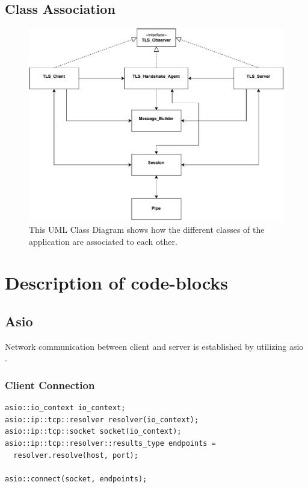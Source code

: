 \documentclass[12pt, letterpaper]{article}
\newenvironment{code}{\captionsetup{type=listing}}{}
\begin{document}
\subsection{Class Association}

\begin{figure}[H]
	\centering
	\includegraphics[width=.7\textwidth]{UML/ClassInteraction}
	\caption{This UML Class Diagram shows how the different classes of the application are associated to each other.}
	\label{fig:ClassInteraction}
\end{figure}

\newpage

\section{Description of code-blocks}


\subsection{Asio}
Network communication between client and server is established by utilizing asio \cite{asio}.

\subsubsection{Client Connection}

\begin{code}
	\begin{verbatim}
asio::io_context io_context;
asio::ip::tcp::resolver resolver(io_context);
asio::ip::tcp::socket socket(io_context);
asio::ip::tcp::resolver::results_type endpoints = 
  resolver.resolve(host, port);

asio::connect(socket, endpoints);

	\end{verbatim}
	\caption{Creation of socket connection on client side.}
	\label{clientConnection}
\end{code}
\end{document}
